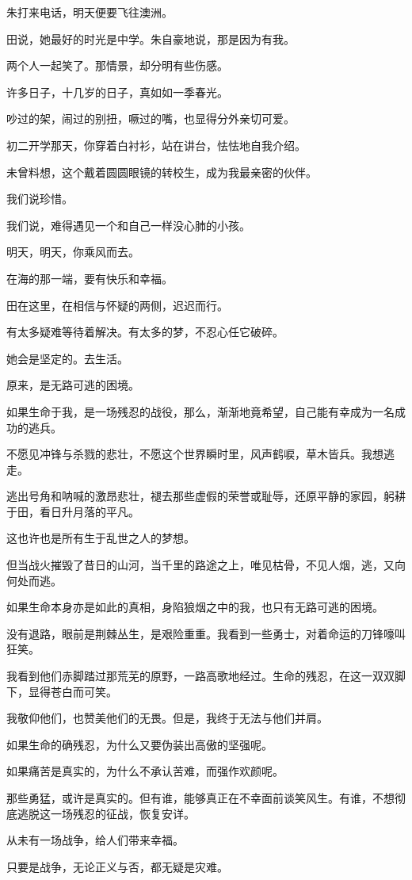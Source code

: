 		朱打来电话，明天便要飞往澳洲。\par
		田说，她最好的时光是中学。朱自豪地说，那是因为有我。\par
		两个人一起笑了。那情景，却分明有些伤感。\par
		许多日子，十几岁的日子，真如如一季春光。\par
		吵过的架，闹过的别扭，噘过的嘴，也显得分外亲切可爱。\par
		初二开学那天，你穿着白衬衫，站在讲台，怯怯地自我介绍。\par
		未曾料想，这个戴着圆圆眼镜的转校生，成为我最亲密的伙伴。

		我们说珍惜。\par
		我们说，难得遇见一个和自己一样没心肺的小孩。

		明天，明天，你乘风而去。\par
		在海的那一端，要有快乐和幸福。

		田在这里，在相信与怀疑的两侧，迟迟而行。\par
		有太多疑难等待着解决。有太多的梦，不忍心任它破碎。

		她会是坚定的。去生活。

	\endwriting



		原来，是无路可逃的困境。

		\vspace{1em}
		如果生命于我，是一场残忍的战役，那么，渐渐地竟希望，自己能有幸成为一名成功的逃兵。\par
		不愿见冲锋与杀戮的悲壮，不愿这个世界瞬时里，风声鹤唳，草木皆兵。我想逃走。\par
		逃出号角和呐喊的激昂悲壮，褪去那些虚假的荣誉或耻辱，还原平静的家园，躬耕于田，看日升月落的平凡。\par
		这也许也是所有生于乱世之人的梦想。\par
		但当战火摧毁了昔日的山河，当千里的路途之上，唯见枯骨，不见人烟，逃，又向何处而逃。\par
		如果生命本身亦是如此的真相，身陷狼烟之中的我，也只有无路可逃的困境。\par
		没有退路，眼前是荆棘丛生，是艰险重重。我看到一些勇士，对着命运的刀锋嚎叫狂笑。\par
		我看到他们赤脚踏过那荒芜的原野，一路高歌地经过。生命的残忍，在这一双双脚下，显得苍白而可笑。\par
		我敬仰他们，也赞美他们的无畏。但是，我终于无法与他们并肩。\par
		如果生命的确残忍，为什么又要伪装出高傲的坚强呢。\par
		如果痛苦是真实的，为什么不承认苦难，而强作欢颜呢。\par
		那些勇猛，或许是真实的。但有谁，能够真正在不幸面前谈笑风生。有谁，不想彻底逃脱这一场残忍的征战，恢复安详。\par
		从未有一场战争，给人们带来幸福。\par
		只要是战争，无论正义与否，都无疑是灾难。


